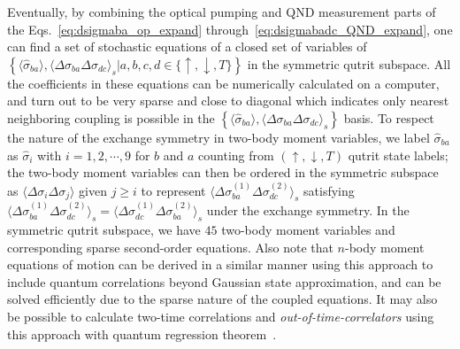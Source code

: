 \documentclass[preprint,aps,pra,onecolumn,superscriptaddress]{revtex4-1} %
\newcommand{\expect}[1]{\big\langle #1 \big\rangle}
\begin{document}
\begin{appendix}
Eventually, by combining the optical pumping and QND measurement parts of the Eqs.~\eqref{eq:dsigmaba_op_expand} through~\eqref{eq:dsigmabadc_QND_expand}, one can find a set of stochastic equations of a closed set of variables of $ \left\{\expect{\hat{\sigma}_{ba}},\expect{\Delta\sigma_{ba}\Delta\sigma_{dc} }_s\left|a,b,c,d\in \{\uparrow,\downarrow,T \}\right. \right\} $ in the symmetric qutrit subspace. All the coefficients in these equations can be numerically calculated on a computer, and turn out to be very sparse and close to diagonal which indicates only nearest neighboring coupling is possible in the $\left\{\expect{\hat{\sigma}_{ba}},\expect{\Delta\sigma_{ba}\Delta\sigma_{dc} }_s\right\}$ basis. To respect the nature of the exchange symmetry in two-body moment variables, we label $ \hat{\sigma}_{ba} $ as $ \hat{\sigma}_i $ with $ i=1,2,\cdots, 9 $ for $ b$ and $a  $ counting from $ (\uparrow,\downarrow,T) $ qutrit state labels; the two-body moment variables can then be ordered in the symmetric subspace as $ \expect{\Delta\sigma_i\Delta\sigma_j} $ given $ j\ge i $ to represent $ \expect{\!\Delta \sigma_{ba}^{(\!1\!)}\! \Delta \sigma_{dc}^{(\!2\!)}}_s $ satisfying $ \expect{\!\Delta \sigma_{ba}^{(\!1\!)}\! \Delta \sigma_{dc}^{(\!2\!)}}_s=\expect{\!\Delta \sigma_{dc}^{(\!1\!)}\! \Delta \sigma_{ba}^{(\!2\!)}}_s $ under the exchange symmetry. In the symmetric qutrit subspace, we have $ 45 $ two-body moment variables and corresponding sparse second-order equations. Also note that $ n $-body moment equations of motion can be derived in a similar manner using this approach to include quantum correlations beyond Gaussian state approximation, and can be solved efficiently due to the sparse nature of the coupled equations. It may also be possible to calculate two-time correlations and \textit{out-of-time-correlators} using this approach with quantum regression theorem~\cite{Swingle2016Measuring,Swain1981Master}.


\end{appendix}
\end{document}
